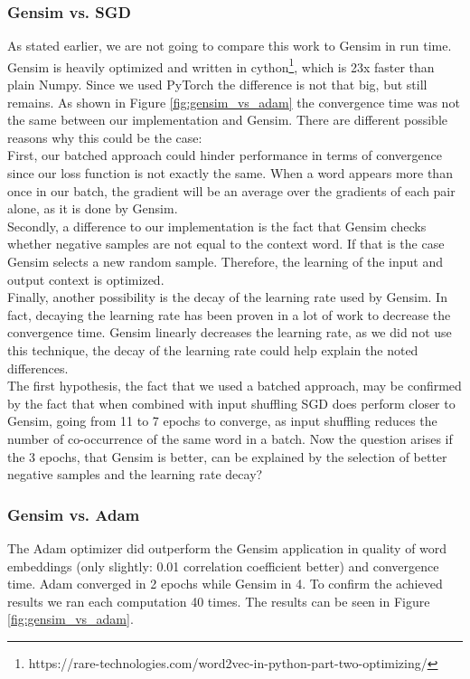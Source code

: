 \subsubsection{Gensim vs. SGD}
As stated earlier, we are not going to compare this work to Gensim in run time. Gensim is heavily optimized and written in cython\footnote{https://rare-technologies.com/word2vec-in-python-part-two-optimizing/}, which is 23x faster than plain Numpy. Since we used PyTorch the difference is not that big, but still remains. As shown in Figure \ref{fig:gensim_vs_adam} the convergence time was not the same between our implementation and Gensim. There are different possible reasons why this could be the case:\\ First, our batched approach could hinder performance in terms of convergence since our loss function is not exactly the same. When a word appears more than once in our batch, the gradient will be an average over the gradients of each pair alone, as it is done by Gensim.\\ Secondly, a difference to our implementation is the fact that Gensim checks whether negative samples are not equal to the context word. If that is the case Gensim selects a new random sample. Therefore, the learning of the input and output context is optimized. \\Finally, another possibility is the decay of the learning rate used by Gensim. In fact, decaying the learning rate has been proven in a lot of work to decrease the convergence time. Gensim linearly decreases the learning rate, as we did not use this technique, the decay of the learning rate could help explain the noted differences. \\ The first hypothesis, the fact that we used a batched approach, may be confirmed by the fact that when combined with input shuffling SGD does perform closer to Gensim, going from 11 to 7 epochs to converge, as input shuffling reduces the number of co-occurrence of the same word in a batch.
Now the question arises if the 3 epochs, that Gensim is better, can be explained by the selection of better negative samples and the learning rate decay?

\subsubsection{Gensim vs. Adam}
The Adam optimizer did outperform the Gensim application in quality of word embeddings (only slightly: 0.01 correlation coefficient better) and convergence time. Adam converged in 2 epochs while Gensim in 4. To confirm the achieved results we ran each computation 40 times. The results can be seen in Figure \ref{fig:gensim_vs_adam}.

